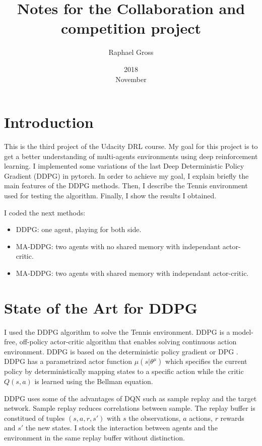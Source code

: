 \documentclass[12pt]{article}
\begin{document}
\title{Notes for the Collaboration and competition project}
\date{2018\\ November}
\author{Raphael Gross}
\maketitle




\section{Introduction}
This is the third project of the Udacity DRL course. My goal for this project is to get a better understanding of multi-agents environments using deep reinforcement learning. I implemented some variations of the last Deep Deterministic Policy Gradient (DDPG) \cite{LillicrapHPHETS15} in pytorch. In order to achieve my goal, I explain briefly the main features of the DDPG methods. Then, I describe the Tennis environment used for testing the algorithm. Finally, I show the results I obtained.

I coded the next methods:
\begin{itemize}
\item DDPG: one agent, playing for both side.
\item MA-DDPG: two agents with no shared memory with independant actor-critic.
\item MA-DDPG: two agents with shared memory  with independant actor-critic.
\end{itemize}

\section{State of the Art for DDPG}

I used the DDPG algorithm to solve the Tennis environment. DDPG is a model-free, off-policy actor-critic algorithm that enables solving continuous action environment. 
DDPG is based on the deterministic policy gradient or DPG \cite{LHDWR14}.
DDPG has a parametrized actor function $\mu(s|{\theta}^{\mu})$ which specifies the current policy by deterministically mapping states to a specific action while the critic $Q(s,a)$ is learned using the Bellman equation.

DDPG uses some of the advantages of DQN \cite{mnih2015humanlevel} such as sample replay and the target network.
Sample replay reduces correlations between sample. The replay buffer is constitued of tuples $(s,a,r,s')$  with $s$ the observations, $a$ actions, $r$ rewards and $s'$ the new states.
I stock the interaction between agents and the environment in the same replay buffer without distinction.
\end{document}
